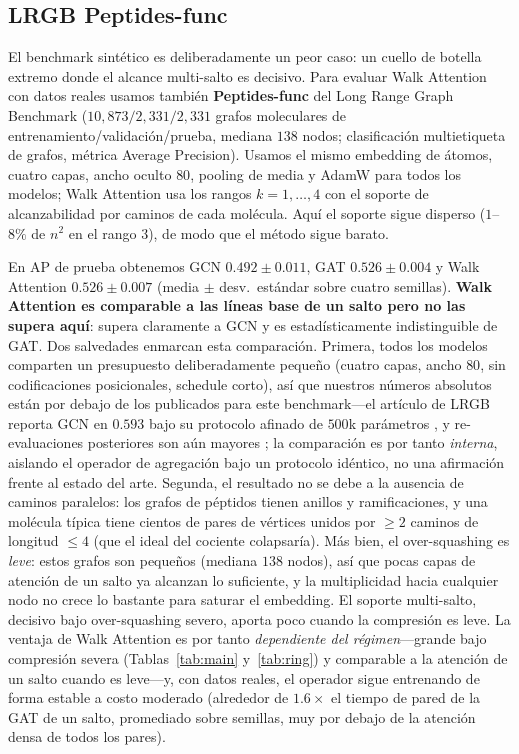 \subsection{LRGB Peptides-func}

El benchmark sintético es deliberadamente un peor caso: un cuello de botella extremo donde
el alcance multi-salto es decisivo. Para evaluar Walk Attention con datos reales
usamos también \textbf{Peptides-func} del Long Range Graph Benchmark
\cite{dwivedi2022lrgb} ($10{,}873/2{,}331/2{,}331$ grafos moleculares de entrenamiento/validación/prueba,
mediana $138$ nodos; clasificación multietiqueta de grafos, métrica Average Precision).
Usamos el mismo embedding de átomos, cuatro capas, ancho oculto $80$, pooling de media
y AdamW para todos los modelos; Walk Attention usa los rangos $k=1,\dots,4$ con
el soporte de alcanzabilidad por caminos de cada molécula. Aquí el soporte sigue
disperso ($1$--$8\%$ de $n^2$ en el rango $3$), de modo que el método sigue barato.

En AP de prueba obtenemos GCN $0.492\pm0.011$, GAT $0.526\pm0.004$ y Walk
Attention $0.526\pm0.007$ (media $\pm$ desv.\ estándar sobre cuatro semillas).
\textbf{Walk Attention es comparable a las líneas base de un salto pero no las
supera aquí}: supera claramente a GCN y es estadísticamente indistinguible de
GAT. Dos salvedades enmarcan esta comparación. Primera, todos los modelos comparten un
presupuesto deliberadamente pequeño (cuatro capas, ancho $80$, sin
codificaciones posicionales, schedule corto), así que nuestros números absolutos
están por debajo de los publicados para este benchmark---el artículo de LRGB
reporta GCN en $0.593$ bajo su protocolo afinado de $500$k parámetros
\cite{dwivedi2022lrgb}, y re-evaluaciones posteriores son aún mayores
\cite{tonshoff2023where}; la comparación es por tanto \emph{interna}, aislando
el operador de agregación bajo un protocolo idéntico, no una afirmación frente
al estado del arte. Segunda, el resultado no se debe a la ausencia de caminos
paralelos: los
grafos de péptidos tienen anillos y ramificaciones, y una molécula típica
tiene cientos de pares de vértices unidos por $\ge 2$ caminos de longitud $\le 4$
(que el ideal del cociente colapsaría). Más bien, el over-squashing es
\emph{leve}: estos grafos son pequeños (mediana $138$ nodos), así que pocas
capas de atención de un salto ya alcanzan lo suficiente, y la
multiplicidad hacia cualquier nodo no crece lo bastante para saturar el
embedding. El soporte multi-salto, decisivo bajo over-squashing severo, aporta
poco cuando la compresión es leve. La ventaja de Walk Attention es por tanto
\emph{dependiente del régimen}---grande bajo compresión severa
(Tablas~\ref{tab:main} y~\ref{tab:ring}) y comparable a la atención de un salto cuando es leve---y,
con datos reales, el operador sigue entrenando de forma estable a costo moderado
(alrededor de $1.6\times$ el tiempo de pared de la GAT de un salto, promediado
sobre semillas, muy por debajo de la atención densa de todos los pares).

